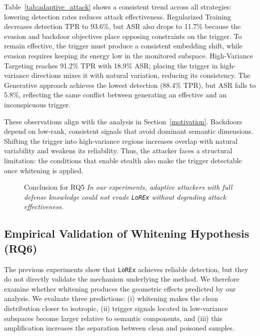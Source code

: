\documentclass[letterpaper,twocolumn,10pt]{article}
\begin{document}
Table~\ref{tab:adaptive_attack} shows a consistent trend across all strategies: lowering detection rates reduces attack effectiveness. 
Regularized Training decreases detection TPR to 93.6\%, but ASR also drops to 11.7\% because the evasion and backdoor objectives place opposing constraints on the trigger. 
To remain effective, the trigger must produce a consistent embedding shift, while evasion requires keeping its energy low in the monitored subspace. 
High-Variance Targeting reaches 91.2\% TPR with 18.9\% ASR; placing the trigger in high-variance directions mixes it with natural variation, reducing its consistency. 
The Generative approach achieves the lowest detection (88.4\% TPR), but ASR falls to 5.8\%, reflecting the same conflict between generating an effective and an inconspicuous trigger.

These observations align with the analysis in Section~\ref{motivation}. 
Backdoors depend on low-rank, consistent signals that avoid dominant semantic dimensions. 
Shifting the trigger into high-variance regions increases overlap with natural variability and weakens its reliability. 
Thus, the attacker faces a structural limitation: the conditions that enable stealth also make the trigger detectable once whitening is applied.


\begin{figure}[H]
\centering
\begin{rqconclusion}{Conclusion for RQ5}
\textit{In our experiments, adaptive attackers with full defense knowledge could not evade \texttt{LoREx} without degrading attack effectiveness.}
\end{rqconclusion}
\vspace{-0.25cm}
\end{figure}

\subsection{Empirical Validation of Whitening Hypothesis (RQ6)}
\label{exp_analysis}
The previous experiments show that \texttt{LoREx} achieves reliable detection, but they do not directly validate the mechanism underlying the method. 
We therefore examine whether whitening produces the geometric effects predicted by our analysis. 
We evaluate three predictions: (i) whitening makes the clean distribution closer to isotropic, 
(ii) trigger signals located in low-variance subspaces become larger relative to semantic components, 
and (iii) this amplification increases the separation between clean and poisoned samples.
\end{document}

